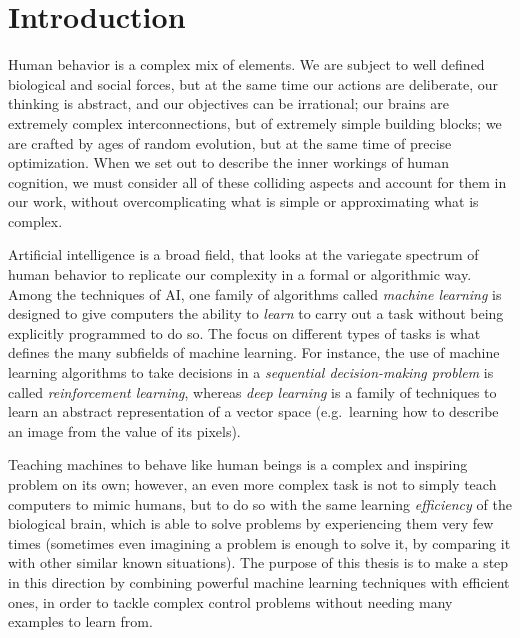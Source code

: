 \chapter{Introduction}
\label{ch1_intro}
\thispagestyle{empty}

\vspace{0.5cm}
 
Human behavior is a complex mix of elements. We are subject to 
well defined biological and social forces, but at the same time our actions are 
deliberate, our thinking is abstract, and our objectives can be irrational; 
our brains are extremely complex interconnections, but of extremely simple 
building blocks; we are crafted by ages of random evolution, but at the same 
time of precise optimization. 
When we set out to describe the inner workings of human cognition, we must 
consider all of these colliding aspects and account for them in our work, 
without overcomplicating what is simple or approximating what is complex.

Artificial intelligence is a broad field, that looks at the variegate spectrum 
of human behavior to replicate our complexity in a formal or algorithmic way. 
Among the techniques of AI, one family of algorithms called \textit{machine
learning} is designed to give computers the ability to \textit{learn} to carry 
out a task without being explicitly programmed to do so. 
The focus on different types of tasks is what defines the many subfields of 
machine learning.
For instance, the use of machine learning algorithms to take decisions in a 
\textit{sequential decision-making problem} is called \textit{reinforcement 
learning}, whereas \textit{deep learning} is a family of techniques to learn an 
abstract representation of a vector space (e.g.\, learning how to describe an
image from the value of its pixels).

Teaching machines to behave like human beings is a complex and inspiring problem
on its own; however, an even more complex task is not to simply teach 
computers to mimic humans, but to do so with the same learning 
\textit{efficiency} of the biological brain, which is able to solve problems by
experiencing them very few times (sometimes even imagining a problem is enough 
to solve it, by comparing it with other similar known situations). 
The purpose of this thesis is to make a step in this direction by
combining powerful machine learning techniques with efficient ones, in order
to tackle complex control problems without needing many examples to learn
from.


